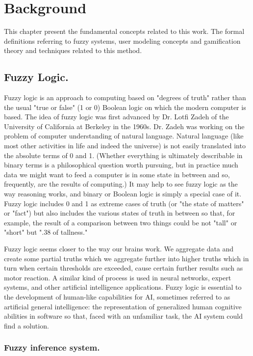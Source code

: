 
\chapter{Background}

This chapter present the fundamental concepts related to this work. The formal
definitions referring to fuzzy systems, user modeling concepts and gamification
theory and techniques related to this method.


\section{Fuzzy Logic.}

Fuzzy logic is an approach to computing based on "degrees of truth" rather than
the usual "true or false" (1 or 0) Boolean logic on which the modern computer is
based. The idea of fuzzy logic was first advanced by Dr. Lotfi Zadeh of the
University of California at Berkeley in the 1960s. Dr. Zadeh was working on the
problem of computer understanding of natural language. Natural language (like
most other activities in life and indeed the universe) is not easily translated
into the absolute terms of 0 and 1. (Whether everything is ultimately
describable in binary terms is a philosophical question worth pursuing, but in
practice much data we might want to feed a computer is in some state in between
and so, frequently, are the results of computing.) It may help to see fuzzy
logic as the way reasoning works, and binary or Boolean logic is simply a
special case of it. Fuzzy logic includes 0 and 1 as extreme cases of truth (or
"the state of matters" or "fact") but also includes the various states of truth
in between so that, for example, the result of a comparison between two things
could be not "tall" or "short" but ".38 of tallness."

Fuzzy logic seems closer to the way our brains work. We aggregate data and
create some partial truths which we aggregate further into higher truths which
in turn when certain thresholds are exceeded, cause certain further results such
as motor reaction. A similar kind of process is used in neural networks, expert
systems, and other artificial intelligence applications. Fuzzy logic is
essential to the development of human-like capabilities for AI, sometimes
referred to as artificial general intelligence: the representation of
generalized human cognitive abilities in software so that, faced with an
unfamiliar task, the AI system could find a solution.

\subsection{Fuzzy inference system.}

